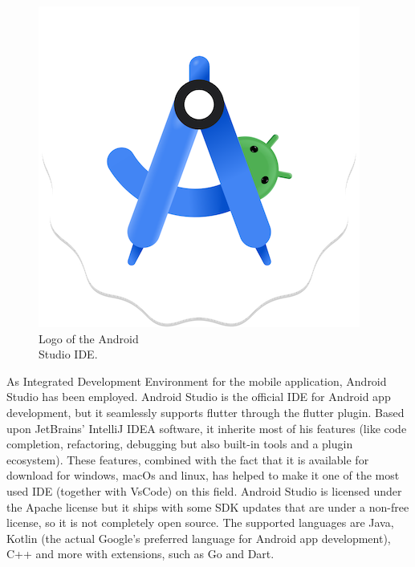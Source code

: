 \begin{figure} %
    \captionsetup{font=footnotesize}
    \centering
    \includegraphics[width=\linewidth]{images/android_studio.png}
    \caption{Logo of the Android\\Studio IDE.}
\end{figure}

As Integrated Development Environment for the mobile application, Android Studio has been employed. Android Studio is the official IDE for Android app development, but it seamlessly supports flutter through the flutter plugin. Based upon JetBrains' IntelliJ IDEA software, it inherite most of his features (like code completion, refactoring, debugging but also built-in tools and a plugin ecosystem). These features, combined with the fact that it is available for download for windows, macOs and linux, has helped to make it one of the most used IDE (together with VsCode) on this field. Android Studio is licensed under the Apache license but it ships with some SDK updates that are under a non-free license, so it is not completely open source. The supported languages are Java, Kotlin (the actual Google's preferred language for Android app development), C++ and more with extensions, such as Go and Dart\cite{AndroidStudio}. 

